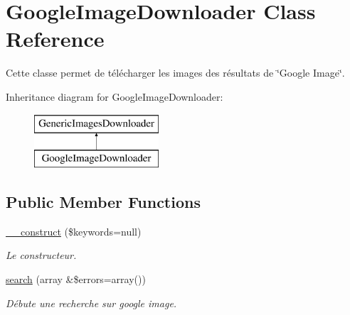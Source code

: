 \hypertarget{class_google_image_downloader}{\section{Google\-Image\-Downloader Class Reference}
\label{class_google_image_downloader}
}


Cette classe permet de télécharger les images des résultats de \char`\"{}\-Google Image\char`\"{}.  


Inheritance diagram for Google\-Image\-Downloader\-:\begin{figure}[H]
\begin{center}
\leavevmode
\includegraphics[height=2.000000cm]{class_google_image_downloader}
\end{center}
\end{figure}
\subsection*{Public Member Functions}
\begin{DoxyCompactItemize}
\item 
\hyperlink{class_google_image_downloader_af7a671cb2bc664328fb5224f0da6ef60}{\-\_\-\-\_\-construct} (\$keywords=null)
\begin{DoxyCompactList}\small\item\em Le constructeur. \end{DoxyCompactList}\item 
\hyperlink{class_google_image_downloader_aeaf78020730e78dd35d16d14b527b44c}{search} (array \&\$errors=array())
\begin{DoxyCompactList}\small\item\em Débute une recherche sur google image. \end{DoxyCompactList}\end{DoxyCompactItemize}
